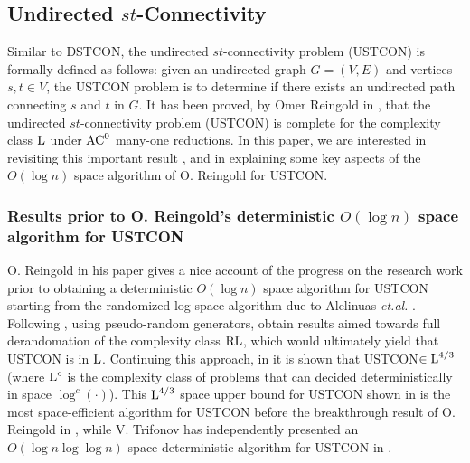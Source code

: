\documentclass{article}
\renewcommand{\L}{\mbox{\rm L}}
\newcommand{\RL}{\mbox{\rm RL}}
\newcommand{\AC}{\mbox{\rm AC}}
\newcommand{\ACzero}{\mbox{$\AC ^0$}}
\begin{document}
\subsection{Undirected $st$-Connectivity}
Similar to DSTCON, the undirected $st$-connectivity problem (USTCON) is formally defined as follows: given an undirected graph $G=(V,E)$ and vertices $s,t\in V$, the USTCON problem is to determine if there exists an undirected path connecting $s$ and $t$ in $G$. It has been proved, by Omer Reingold in \cite{Rei2008}, that the undirected $st$-connectivity problem (USTCON) is complete for the complexity class $\L$ under $\ACzero$ many-one reductions. In this paper, we are interested in revisiting this important result \cite{Rei2008}, and in explaining some key aspects of the $O(\log n)$ space algorithm of O. Reingold for USTCON. 

\subsubsection{Results prior to O. Reingold's deterministic $O(\log n)$ space algorithm for USTCON}
O. Reingold in his paper \cite[Introduction]{Rei2008} gives a nice account of the progress on the research work prior to obtaining a deterministic $O(\log n)$ space algorithm for USTCON starting from the randomized log-space algorithm due to Alelinuas {\em et.al.} \cite{AKLLR1979}. Following \cite{AKLLR1979},  using pseudo-random generators, \cite{AKS1987, BNS1989, NSW1989, Nis1992, INW1994} obtain results aimed towards full derandomation of the complexity class $\RL$, which would ultimately yield that USTCON is in $\L$. Continuing this approach, in \cite{ATWZ2000} it is shown that USTCON$\in \L^{4/3}$ (where $\L ^c$ is the complexity class of problems that can decided deterministically in space $\log ^c(\cdot )$). This  $\L^{4/3}$ space upper bound for USTCON shown in \cite{ATWZ2000} is the most space-efficient algorithm for USTCON before the breakthrough result of O. Reingold in \cite{Rei2008}, while V. Trifonov has independently presented an $O(\log n\log\log n)$-space deterministic algorithm for USTCON in \cite{Tri2005}.
\end{document}
